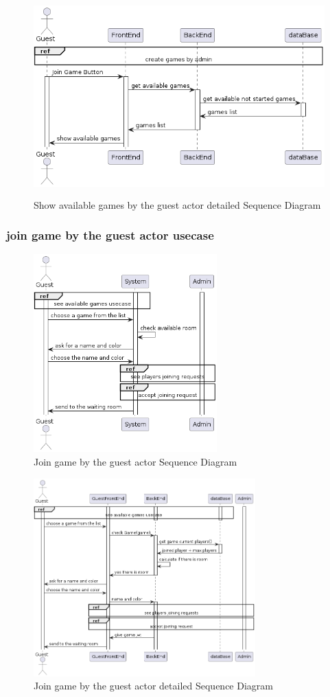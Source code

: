 \documentclass{article}
\begin{document}
 \begin{figure}[H]
	 \centering
	 \includegraphics[height=3in]{../thesis_tex/assets/diagrams/guest_show_available_games_detailedSD.png}
	 \caption{Show available games by the guest actor detailed Sequence Diagram}
\end{figure}

\subsubsection{join game by the guest actor usecase}
 \begin{figure}[H]
	 \centering
	 \includegraphics[height=3in]{../thesis_tex/assets/diagrams/guest_join_game_SD.png}
	 \caption{Join game by the guest actor Sequence Diagram}
\end{figure}

 \begin{figure}[H]
	 \centering
	 \includegraphics[height=3in]{../thesis_tex/assets/diagrams/guest_join_game_detailedSD.png}
	 \caption{Join game by the guest actor detailed Sequence Diagram}
\end{figure}
\end{document}
